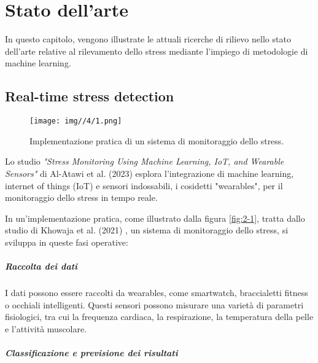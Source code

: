\pagestyle{fancy}

\fancyhf{}

\fancyfoot[C]{\thepage}


\chapter{Stato dell'arte}

\large

In questo capitolo, vengono illustrate le attuali ricerche di rilievo nello stato dell'arte relative al rilevamento dello stress mediante l'impiego di metodologie di machine learning.

\section{Real-time stress detection}

\begin{figure}[t]
    \centering
    \texttt{[image: img//4/1.png]}
    \caption{Implementazione pratica di un sistema di monitoraggio dello stress.}
    \label{fig:4-1}
\end{figure}

Lo studio \textit{"Stress Monitoring Using Machine Learning, IoT, and Wearable Sensors"} di Al-Atawi et al. (2023) \cite{al2023stress} esplora l'integrazione di machine learning, internet of things (IoT) e sensori indossabili, i cosidetti "wearables", per il monitoraggio dello stress in tempo reale.

\bigskip

In un'implementazione pratica, come illustrato dalla figura \ref{fig:2-1}, tratta dallo studio di Khowaja et al. (2021) \cite{khowaja2021toward}, un sistema di monitoraggio dello stress, si sviluppa in queste fasi operative:

\paragraph{Raccolta dei dati}

I dati possono essere raccolti da wearables, come smartwatch, braccialetti fitness o occhiali intelligenti. Questi sensori possono misurare una varietà di parametri fisiologici, tra cui la frequenza cardiaca, la respirazione, la temperatura della pelle e l'attività muscolare.

\paragraph{Classificazione e previsione dei risultati}

